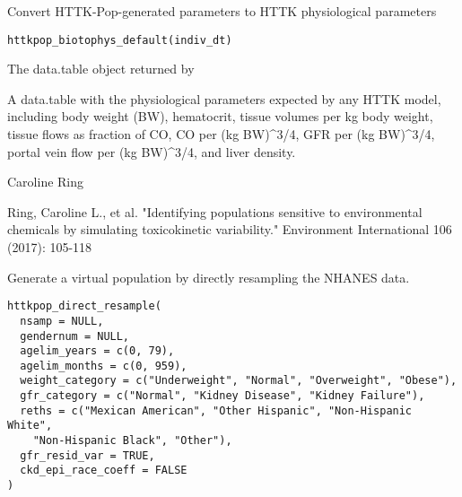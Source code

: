 \documentclass[a4paper]{book}
\begin{document}
%
\begin{Description}\relax
Convert HTTK-Pop-generated parameters to HTTK physiological parameters
\end{Description}
%
\begin{Usage}
\begin{verbatim}
httkpop_biotophys_default(indiv_dt)
\end{verbatim}
\end{Usage}
%
\begin{Arguments}
\begin{ldescription}
\item[\code{indiv\_dt}] The data.table object returned by 
\end{ldescription}
\end{Arguments}
%
\begin{Value}
A data.table with the physiological parameters expected by any HTTK 
model, including body weight (BW), hematocrit, tissue volumes per kg body
weight, tissue flows as fraction of CO, CO per (kg BW)\textasciicircum{}3/4, GFR per (kg
BW)\textasciicircum{}3/4, portal vein flow per (kg BW)\textasciicircum{}3/4, and liver density.
\end{Value}
%
\begin{Author}\relax
Caroline Ring
\end{Author}
%
\begin{References}\relax
Ring, Caroline L., et al. "Identifying populations sensitive to 
environmental chemicals by simulating toxicokinetic variability." Environment 
International 106 (2017): 105-118
\end{References}
%
\begin{Description}\relax
Generate a virtual population by directly resampling the NHANES data.
\end{Description}
%
\begin{Usage}
\begin{verbatim}
httkpop_direct_resample(
  nsamp = NULL,
  gendernum = NULL,
  agelim_years = c(0, 79),
  agelim_months = c(0, 959),
  weight_category = c("Underweight", "Normal", "Overweight", "Obese"),
  gfr_category = c("Normal", "Kidney Disease", "Kidney Failure"),
  reths = c("Mexican American", "Other Hispanic", "Non-Hispanic White",
    "Non-Hispanic Black", "Other"),
  gfr_resid_var = TRUE,
  ckd_epi_race_coeff = FALSE
)
\end{verbatim}
\end{Usage}
\end{document}
